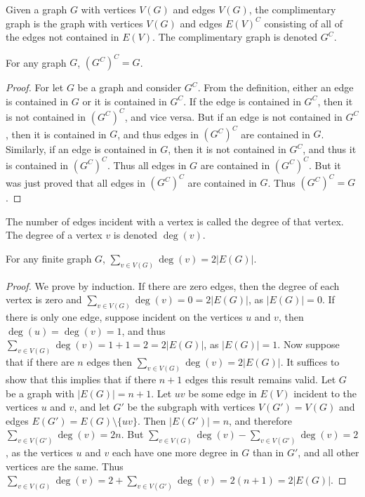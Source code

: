 \documentclass[crop=false,class=book,oneside]{standalone}
\begin{document}
        \begin{definition}
            Given a graph $G$ with vertices $V(G)$ and
            edges $V(G)$, the complimentary graph is the
            graph with vertices $V(G)$ and edges $E(V)^C$
            consisting of all of the edges not contained
            in $E(V)$. The complimentary graph
            is denoted $G^C$.
        \end{definition}
        \begin{theorem}
            For any graph $G$, $(G^C)^{C}=G$.
        \end{theorem}
        \begin{proof}
            For let $G$ be a graph and consider $G^C$.
            From the definition, either an edge is contained
            in $G$ or it is contained in $G^C$. If the edge
            is contained in $G^C$, then it is not contained
            in $(G^C)^C$, and vice versa. But if an edge is
            not contained in $G^C$, then it is contained in
            $G$, and thus edges in $(G^C)^C$ are contained in
            $G$. Similarly, if an edge is contained in $G$, then
            it is not contained in $G^C$, and thus it is contained
            in $(G^C)^C$. Thus all edges in $G$ are contained
            in $(G^C)^C$. But it was just proved that all edges
            in $(G^C)^{C}$ are contained in $G$.
            Thus $(G^C)^{C}=G$.
        \end{proof}
        \begin{definition}
        The number of edges incident with a vertex is called the degree of that vertex. The degree of a vertex $v$ is denoted $\deg(v)$.
        \end{definition}
        \begin{theorem}
        For any finite graph $G$, $\sum_{v\in V(G)} \deg(v) = 2|E(G)|$.
        \end{theorem}
        \begin{proof}
        We prove by induction. If there are zero edges, then the degree of each vertex is zero and $\sum_{v\in V(G)}\deg(v) = 0 = 2|E(G)|$, as $|E(G)| = 0$. If there is only one edge, suppose incident on the vertices $u$ and $v$, then $\deg(u) = \deg(v) = 1$, and thus $\sum_{v\in V(G)} \deg(v) = 1+1 = 2 = 2|E(G)|$, as $|E(G)| = 1$. Now suppose that if there are $n$ edges then $\sum_{v\in V(G)}\deg(v) = 2|E(G)|$. It suffices to show that this implies that if there $n+1$ edges this result remains valid. Let $G$ be a graph with $|E(G)| = n+1$. Let $uv$ be some edge in $E(V)$ incident to the vertices $u$ and $v$, and let $G'$ be the subgraph with vertices $V(G') = V(G)$ and edges $E(G')=E(G)\setminus \{uv\}$. Then $|E(G')| = n$, and therefore $\sum_{v\in V(G')}\deg(v) = 2n$. But $\sum_{v\in V(G)} \deg(v) - \sum_{v\in V(G')}\deg(v) = 2$, as the vertices $u$ and $v$ each have one more degree in $G$ than in $G'$, and all other vertices are the same. Thus $\sum_{v\in V(G)}\deg(v) = 2 + \sum_{v\in V(G')}\deg(v) = 2(n+1) = 2|E(G)|$.
        \end{proof}
\end{document}
